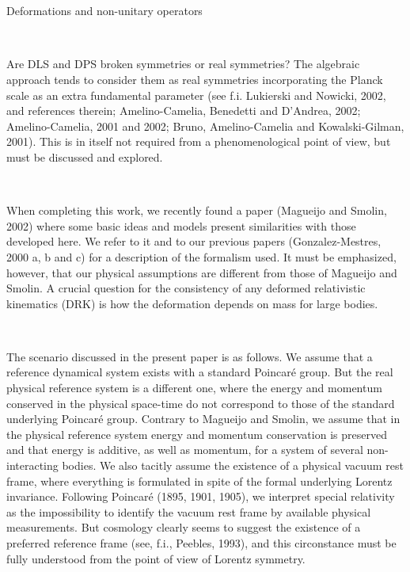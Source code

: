 \documentclass[a4paper,12pt,dvips]{article}
\makeatletter
\renewcommand{\section}{\@startsection{section}{1}{0in}
	{0.4\baselineskip}{0.1\baselineskip}{\Large\bf}}
\makeatother
\begin{document}
~

%
%
~ 

\section{Deformations and non-unitary operators}
\label{relativity.sec}

~
~ 

Are DLS and DPS broken symmetries or real symmetries? The algebraic approach tends to consider them as real symmetries incorporating the Planck scale as an extra fundamental parameter (see f.i. Lukierski and Nowicki, 2002, and references therein; Amelino-Camelia, Benedetti and D'Andrea, 2002; Amelino-Camelia, 2001 and 2002; Bruno, Amelino-Camelia and Kowalski-Gilman, 2001). This is in itself not required from a phenomenological point of view, but must be discussed and explored.

~ 

When completing this work, we recently found a paper (Magueijo and Smolin, 2002) where some basic ideas and models present similarities with those developed here. We refer to it and to our previous papers (Gonzalez-Mestres, 2000 a, b and c) for a description of the formalism used. It must be emphasized, however, that our physical assumptions are different from those of Magueijo and Smolin. A crucial question for the consistency of any deformed relativistic kinematics (DRK) is how the deformation depends on mass for large bodies.

~ 

The scenario discussed in the present paper is as follows. We assume that a reference dynamical system exists with a standard Poincar\'e group. But the real physical reference system is a different one, where the energy and momentum conserved in the physical space-time do not correspond to those of the standard underlying Poincar\'e group. Contrary to Magueijo and Smolin, we assume that in the physical reference system energy and momentum conservation is preserved and that energy is additive, as well as momentum, for a system of several non-interacting bodies. We also tacitly assume the existence of a physical vacuum rest frame, where everything is formulated in spite of the formal underlying Lorentz invariance. Following Poincar\'e (1895, 1901, 1905), we interpret special relativity as the impossibility to identify the vacuum rest frame by available physical measurements. But cosmology clearly seems to suggest the existence of a preferred reference frame (see, f.i., Peebles, 1993), and this circonstance must be fully understood from the point of view of Lorentz symmetry.
\end{document}
